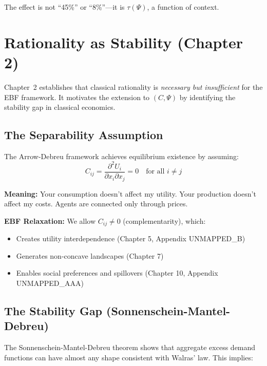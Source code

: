 The effect is not ``45\%'' or ``8\%''---it is $\tau(\Psi)$, a function of context.

\section{Rationality as Stability (Chapter 2)}
\label{sec:mp-rationality}

Chapter~2 establishes that classical rationality is \textit{necessary but insufficient}
for the EBF framework. It motivates the extension to $(C, \Psi)$ by identifying
the stability gap in classical economics.

\subsection{The Separability Assumption}

The Arrow-Debreu framework achieves equilibrium existence by assuming:
\begin{equation}
\boxed{
C_{ij} = \frac{\partial^2 U_i}{\partial x_i \partial x_j} = 0 \quad \text{for all } i \neq j
}
\label{eq:mp-separability}
\end{equation}

\textbf{Meaning:} Your consumption doesn't affect my utility. Your production doesn't
affect my costs. Agents are connected only through prices.

\textbf{EBF Relaxation:} We allow $C_{ij} \neq 0$ (complementarity), which:
\begin{itemize}
\item Creates utility interdependence (Chapter 5, Appendix UNMAPPED_B)
\item Generates non-concave landscapes (Chapter 7)
\item Enables social preferences and spillovers (Chapter 10, Appendix UNMAPPED_AAA)
\end{itemize}

\subsection{The Stability Gap (Sonnenschein-Mantel-Debreu)}

The Sonnenschein-Mantel-Debreu theorem shows that aggregate excess demand functions
can have almost any shape consistent with Walras' law. This implies:

